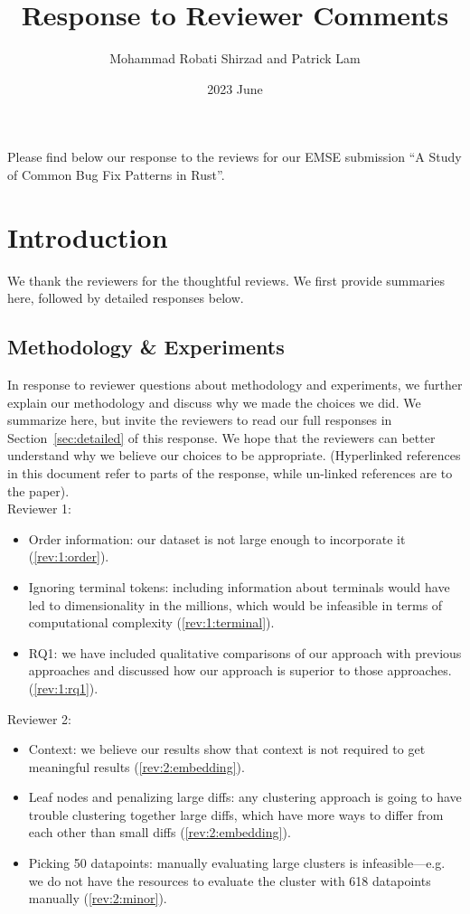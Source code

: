 \documentclass{article}
\title{Response to Reviewer Comments}
\date{2023 June}
\author{Mohammad Robati Shirzad and Patrick Lam}
\begin{document}
\maketitle

Please find below our response to the reviews for our EMSE submission ``A Study of Common Bug Fix Patterns in Rust''.

\section{Introduction}

We thank the reviewers for the thoughtful reviews. We first provide summaries here, followed by detailed responses below.

\subsection{Methodology \& Experiments}

In response to reviewer questions about methodology and experiments, we further explain our methodology and discuss why we made the choices we did. We summarize here, but invite the reviewers to read our full responses in Section~\ref{sec:detailed} of this response. We hope that the reviewers can better understand why we believe our choices to be appropriate. (Hyperlinked references in this document refer to parts of the response, while un-linked references are to the paper).\\ 

Reviewer 1:
\begin{itemize}
    \item Order information: our dataset is not large enough to incorporate it (\ref{rev:1:order}).
    \item Ignoring terminal tokens: including information about terminals would have led to dimensionality in the millions, which would be infeasible in terms of computational complexity (\ref{rev:1:terminal}). 
    \item RQ1: we have included qualitative comparisons of our approach with previous approaches and discussed how our approach is superior to those approaches. (\ref{rev:1:rq1}).
\end{itemize} 

Reviewer 2:
\begin{itemize}
    \item Context: we believe our results show that context is not required to get meaningful results (\ref{rev:2:embedding}).
    \item Leaf nodes and penalizing large diffs: any clustering approach is going to have trouble clustering together large diffs, which have more ways to differ from each other than small diffs (\ref{rev:2:embedding}). 
    \item Picking 50 datapoints: manually evaluating large clusters is infeasible---e.g. we do not have the resources to evaluate the cluster with 618 datapoints manually (\ref{rev:2:minor}).
\end{itemize}
\end{document}
